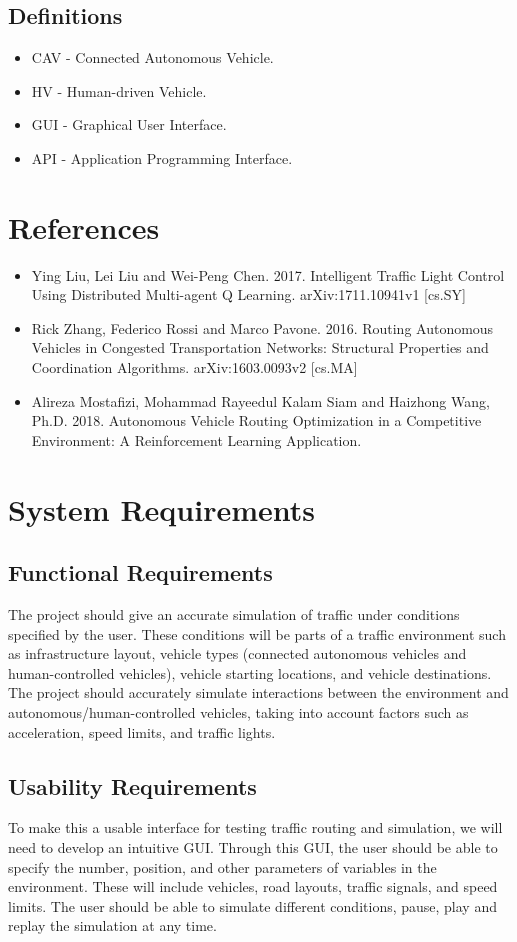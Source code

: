 \documentclass[onecolumn, draftclsnofoot,10pt, compsoc]{IEEEtran}
\begin{document}
\subsection{Definitions}
\begin{itemize}
\item CAV - Connected Autonomous Vehicle.
\item HV - Human-driven Vehicle.
\item GUI - Graphical User Interface.
\item API - Application Programming Interface.
\end{itemize}
\section{References}
\begin{itemize}
\item Ying Liu, Lei Liu and Wei-Peng Chen. 2017. Intelligent Traffic Light Control Using Distributed Multi-agent Q Learning. arXiv:1711.10941v1 [cs.SY]
\item Rick Zhang, Federico Rossi and Marco Pavone. 2016. Routing Autonomous Vehicles in Congested Transportation Networks: Structural Properties and Coordination Algorithms. arXiv:1603.0093v2 [cs.MA]
\item Alireza Mostafizi, Mohammad Rayeedul Kalam Siam and Haizhong Wang, Ph.D. 2018.  Autonomous Vehicle Routing Optimization in a Competitive Environment: A Reinforcement Learning Application.
\end{itemize}
\section{System Requirements}
\subsection{Functional Requirements}
The project should give an accurate simulation of traffic under conditions specified by the user.
These conditions will be parts of a traffic environment such as infrastructure layout, vehicle types (connected autonomous vehicles and human-controlled vehicles), vehicle starting locations, and vehicle destinations.
The project should accurately simulate interactions between the environment and autonomous/human-controlled vehicles, taking into account factors such as acceleration, speed limits, and traffic lights.
\subsection{Usability Requirements}
To make this a usable interface for testing traffic routing and simulation, we will need to develop an intuitive GUI.
Through this GUI, the user should be able to specify the number, position, and other parameters of variables in the environment.
These will include vehicles, road layouts, traffic signals, and speed limits.
The user should be able to simulate different conditions, pause, play and replay the simulation at any time.
\end{document}
